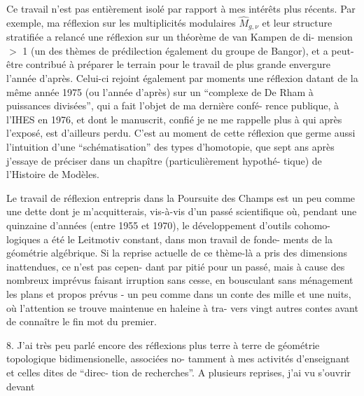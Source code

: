 
Ce travail n'est pas entièrement isolé par rapport à
mes intérêts plus récents. Par exemple, ma réflexion sur les
multiplicités modulaires $\widehat{M}_{g,\nu}$ et leur structure stratifiée
a relancé une réflexion sur un théorème de van Kampen de di-%
mension $>$ 1 (un des thèmes de prédilection également du groupe
de Bangor), et a peut-être contribué à préparer le terrain pour
le travail de plus grande envergure l'année d'après. Celui-ci
rejoint également par moments une réflexion datant de la même
année 1975 (ou l'année d'après) sur un ``complexe de De Rham à
puissances divisées'', qui a fait l'objet de ma dernière confé-%
rence publique, à l'IHES en 1976, et dont le manuscrit, confié
je ne me rappelle plus à qui après l'exposé, est d'ailleurs perdu.
C'est au moment de cette réflexion que germe aussi l'intuition
d'une ``schématisation'' des types d'homotopie, que sept ans après
j'essaye de préciser dans un chapître (particulièrement hypothé-%
tique) de l'Histoire de Modèles.

Le travail de réflexion entrepris dans la Poursuite
des Champs est un peu comme une dette dont je m'acquitterais,
vis-à-vis d'un passé scientifique où, pendant une quinzaine
d'années (entre 1955 et 1970), le développement d'outils cohomo-%
logiques a été le Leitmotiv constant, dans mon travail de fonde-%
ments de la géométrie algébrique. Si la reprise actuelle de ce
thème-là a pris des dimensions inattendues, ce n'est pas cepen-%
dant par pitié pour un passé, mais à cause des nombreux imprévus
faisant irruption sans cesse, en bousculant sans ménagement les
plans et propos prévus - un peu comme dans un conte des mille et
une nuits, où l'attention se trouve maintenue en haleine à tra-%
vers vingt autres contes avant de connaître le fin mot du premier.


8. J'ai très peu parlé encore des réflexions plus terre
à terre de géométrie topologique bidimensionelle, associées no-%
tamment à mes activités d'enseignant et celles dites de ``direc-%
tion de recherches''. A plusieurs reprises, j'ai vu s'ouvrir devant

